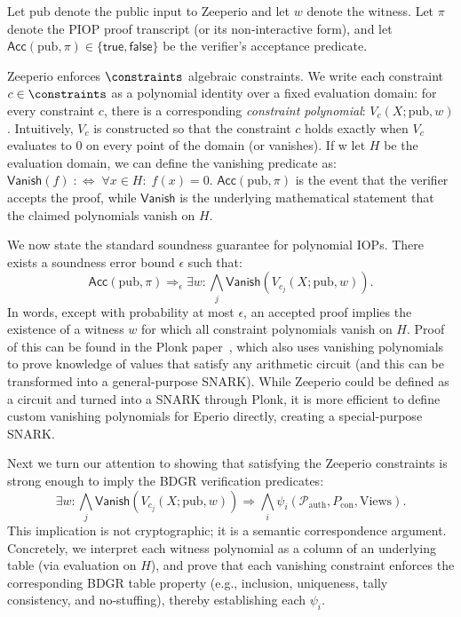 Let $\mathrm{pub}$ denote the public input to Zeeperio and let $w$ denote the witness. Let $\pi$ denote the PIOP proof transcript (or its non-interactive form), and let $\mathsf{Acc}(\mathrm{pub},\pi)\in\{\mathsf{true},\mathsf{false}\}$ be the verifier’s acceptance predicate.

Zeeperio enforces $\constraints$ algebraic constraints. We write each constraint $c\in\constraints$ as a polynomial identity over a fixed evaluation domain: for every constraint $c$, there is a corresponding \emph{constraint polynomial}: $V_{c}(X;\mathrm{pub},w)$. Intuitively, $V_c$ is constructed so that the constraint $c$ holds exactly when $V_c$ evaluates to $0$ on every point of the domain (or vanishes). If w let $H$ be the evaluation domain, we can define the vanishing predicate as: $\mathsf{Vanish}(f)\;:\Leftrightarrow\;\forall x\in H:\; f(x)=0$. $\mathsf{Acc}(\mathrm{pub},\pi)$ is the event that the verifier accepts the proof, while $\mathsf{Vanish}$ is the underlying mathematical statement that the claimed polynomials vanish on $H$.

We now state the standard soundness guarantee for polynomial IOPs. There exists a soundness error bound $\epsilon$ such that:
\[
\mathsf{Acc}(\mathrm{pub},\pi)\Rightarrow_{\epsilon}\exists w:\bigwedge_j \mathsf{Vanish}\!\left(V_{c_j}(X;\mathrm{pub},w)\right).
\]
In words, except with probability at most $\epsilon$, an accepted proof implies the existence of a witness $w$ for which all constraint polynomials vanish on $H$. Proof of this can be found in the Plonk paper~\cite{GWC19}, which also uses vanishing polynomials to prove knowledge of values that satisfy any arithmetic circuit (and this can be transformed into a general-purpose SNARK). While Zeeperio could be defined as a circuit and turned into a SNARK through Plonk, it is more efficient to define custom vanishing polynomials for Eperio directly, creating a special-purpose SNARK. 

Next we turn our attention to showing that satisfying the Zeeperio constraints is strong enough to imply the BDGR verification predicates:
\[
\exists w:\bigwedge_j \mathsf{Vanish}\!\left(V_{c_j}(X;\mathrm{pub},w)\right)\Rightarrow \bigwedge_i \psi_i(\mathcal{P}_{\mathrm{auth}},P_{\mathrm{con}},\mathrm{Views}).
\]
This implication is not cryptographic; it is a semantic correspondence argument. Concretely, we interpret each witness polynomial as a column of an underlying table (via evaluation on $H$), and prove that each vanishing constraint enforces the corresponding BDGR table property (e.g., inclusion, uniqueness, tally consistency, and no-stuffing), thereby establishing each $\psi_i$.


